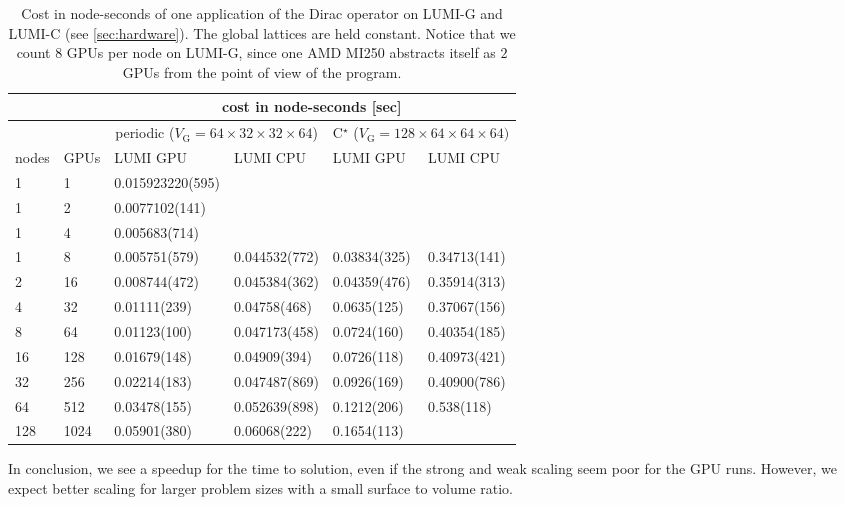 \begin{table*}
\begin{tabular}{ll|ll|ll}
\toprule
 && \multicolumn{4}{c}{cost in node-seconds [sec]} \\
\midrule
 && \multicolumn{2}{c}{periodic ($V_\mathrm{G}=64\times32\times32\times64$)} & \multicolumn{2}{c}{C$^\star$ ($V_\mathrm{G}=128\times64\times64\times64)$} \\
\midrule
nodes & GPUs & LUMI GPU & LUMI CPU & LUMI GPU & LUMI CPU \\
\midrule
  1 &    1 & 0.015923220(595) &               &              &              \\
  1 &    2 &   0.0077102(141) &               &              &              \\
  1 &    4 &    0.005683(714) &               &              &              \\
  1 &    8 &    0.005751(579) & 0.044532(772) & 0.03834(325) & 0.34713(141) \\
  2 &   16 &    0.008744(472) & 0.045384(362) & 0.04359(476) & 0.35914(313) \\
  4 &   32 &     0.01111(239) &  0.04758(468) &  0.0635(125) & 0.37067(156) \\
  8 &   64 &     0.01123(100) & 0.047173(458) &  0.0724(160) & 0.40354(185) \\
 16 &  128 &     0.01679(148) &  0.04909(394) &  0.0726(118) & 0.40973(421) \\
 32 &  256 &     0.02214(183) & 0.047487(869) &  0.0926(169) & 0.40900(786) \\
 64 &  512 &     0.03478(155) & 0.052639(898) &  0.1212(206) &   0.538(118) \\
128 & 1024 &     0.05901(380) &  0.06068(222) &  0.1654(113) &              \\
\bottomrule
\end{tabular}
\caption{Cost in node-seconds of one application of the Dirac operator on LUMI-G and LUMI-C (see \cref{sec:hardware}).  The global lattices are held constant. Notice that we count $8$ GPUs per node on LUMI-G, since one AMD MI250 abstracts itself as $2$ GPUs from the point of view of the program.}
\label{tab:nodehours_lumi}
\end{table*}

In conclusion, we see a speedup for the time to solution, even if the strong and weak scaling seem poor for the GPU runs. However, we expect better scaling for larger problem sizes with a small surface to volume ratio.

